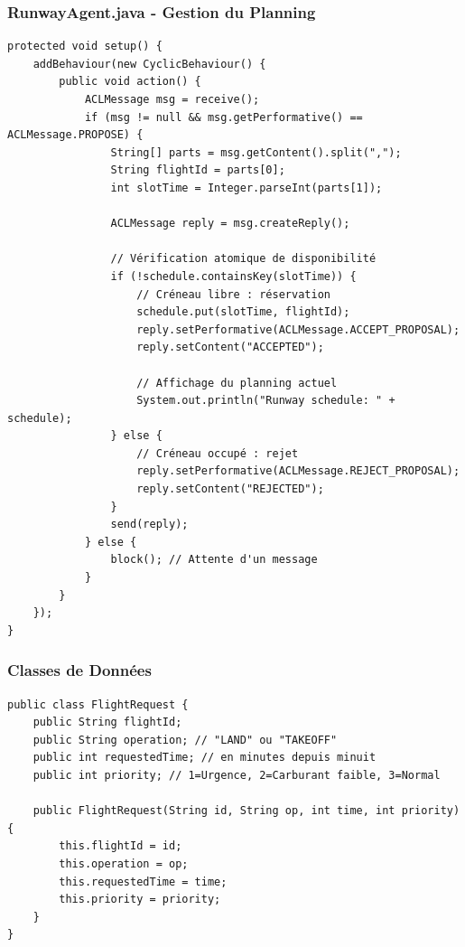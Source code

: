\documentclass[12pt,a4paper]{article}
\begin{document}
\subsubsection{RunwayAgent.java - Gestion du Planning}

\begin{lstlisting}[caption=RunwayAgent.java - Vérification et réservation]
protected void setup() {
    addBehaviour(new CyclicBehaviour() {
        public void action() {
            ACLMessage msg = receive();
            if (msg != null && msg.getPerformative() == ACLMessage.PROPOSE) {
                String[] parts = msg.getContent().split(",");
                String flightId = parts[0];
                int slotTime = Integer.parseInt(parts[1]);

                ACLMessage reply = msg.createReply();

                // Vérification atomique de disponibilité
                if (!schedule.containsKey(slotTime)) {
                    // Créneau libre : réservation
                    schedule.put(slotTime, flightId);
                    reply.setPerformative(ACLMessage.ACCEPT_PROPOSAL);
                    reply.setContent("ACCEPTED");

                    // Affichage du planning actuel
                    System.out.println("Runway schedule: " + schedule);
                } else {
                    // Créneau occupé : rejet
                    reply.setPerformative(ACLMessage.REJECT_PROPOSAL);
                    reply.setContent("REJECTED");
                }
                send(reply);
            } else {
                block(); // Attente d'un message
            }
        }
    });
}
\end{lstlisting}

\subsubsection{Classes de Données}

\begin{lstlisting}[caption=FlightRequest.java - Modèle de demande]
public class FlightRequest {
    public String flightId;
    public String operation; // "LAND" ou "TAKEOFF"
    public int requestedTime; // en minutes depuis minuit
    public int priority; // 1=Urgence, 2=Carburant faible, 3=Normal

    public FlightRequest(String id, String op, int time, int priority) {
        this.flightId = id;
        this.operation = op;
        this.requestedTime = time;
        this.priority = priority;
    }
}
\end{lstlisting}
\end{document}
